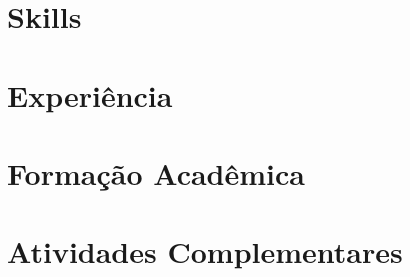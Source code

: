 \documentclass[letter,10pt]{article}
\begin{document}


\section{Skills}


\section{Experiência}


\section{Formação Acadêmica}



\section{Atividades Complementares}

\end{document}
